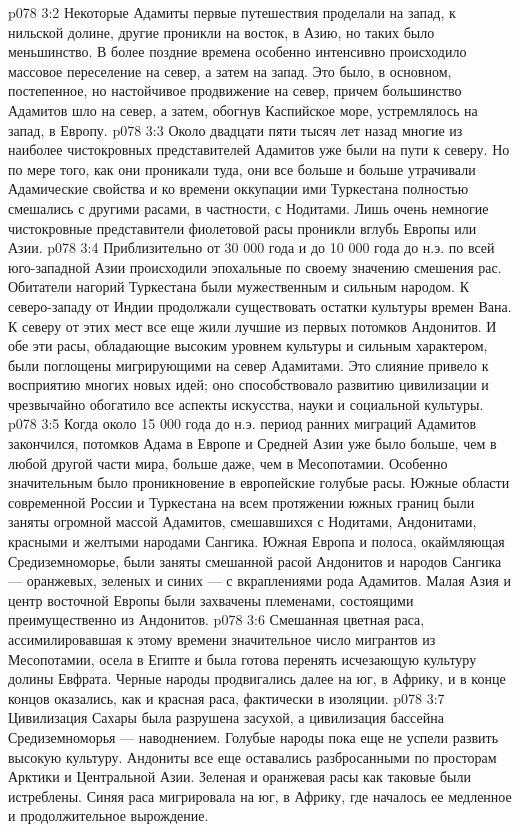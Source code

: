 \vs p078 3:2 Некоторые Адамиты первые путешествия проделали на запад, к нильской долине, другие проникли на восток, в Азию, но таких было меньшинство. В более поздние времена особенно интенсивно происходило массовое переселение на север, а затем на запад. Это было, в основном, постепенное, но настойчивое продвижение на север, причем большинство Адамитов шло на север, а затем, обогнув Каспийское море, устремлялось на запад, в Европу.
\vs p078 3:3 Около двадцати пяти тысяч лет назад многие из наиболее чистокровных представителей Адамитов уже были на пути к северу. Но по мере того, как они проникали туда, они все больше и больше утрачивали Адамические свойства и ко времени оккупации ими Туркестана полностью смешались с другими расами, в частности, с Нодитами. Лишь очень немногие чистокровные представители фиолетовой расы проникли вглубь Европы или Азии.
\vs p078 3:4 Приблизительно от 30 000 года и до 10 000 года до н.э. по всей юго\hyp{}западной Азии происходили эпохальные по своему значению смешения рас. Обитатели нагорий Туркестана были мужественным и сильным народом. К северо\hyp{}западу от Индии продолжали существовать остатки культуры времен Вана. К северу от этих мест все еще жили лучшие из первых потомков Андонитов. И обе эти расы, обладающие высоким уровнем культуры и сильным характером, были поглощены мигрирующими на север Адамитами. Это слияние привело к восприятию многих новых идей; оно способствовало развитию цивилизации и чрезвычайно обогатило все аспекты искусства, науки и социальной культуры.
\vs p078 3:5 \pc Когда около 15 000 года до н.э. период ранних миграций Адамитов закончился, потомков Адама в Европе и Средней Азии уже было больше, чем в любой другой части мира, больше даже, чем в Месопотамии. Особенно значительным было проникновение в европейские голубые расы. Южные области современной России и Туркестана на всем протяжении южных границ были заняты огромной массой Адамитов, смешавшихся с Нодитами, Андонитами, красными и желтыми народами Сангика. Южная Европа и полоса, окаймляющая Средиземноморье, были заняты смешанной расой Андонитов и народов Сангика --- оранжевых, зеленых и синих --- с вкраплениями рода Адамитов. Малая Азия и центр восточной Европы были захвачены племенами, состоящими преимущественно из Андонитов.
\vs p078 3:6 Смешанная цветная раса, ассимилировавшая к этому времени значительное число мигрантов из Месопотамии, осела в Египте и была готова перенять исчезающую культуру долины Евфрата. Черные народы продвигались далее на юг, в Африку, и в конце концов оказались, как и красная раса, фактически в изоляции.
\vs p078 3:7 Цивилизация Сахары была разрушена засухой, а цивилизация бассейна Средиземноморья --- наводнением. Голубые народы пока еще не успели развить высокую культуру. Андониты все еще оставались разбросанными по просторам Арктики и Центральной Азии. Зеленая и оранжевая расы как таковые были истреблены. Синяя раса мигрировала на юг, в Африку, где началось ее медленное и продолжительное вырождение.
